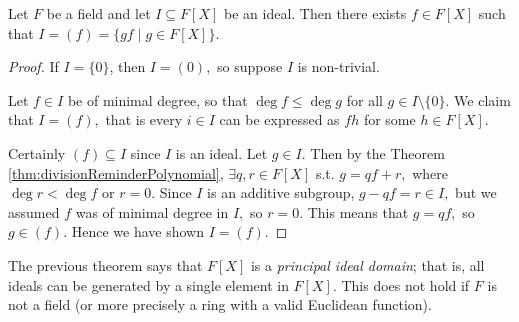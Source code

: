 \begin{theorem}
  Let $F$ be a field and let $I\subseteq F[X]$ be an ideal. Then there exists $f\in
  F[X]$ such that $I=(f)=\{gf \mid g\in F[X]\}$.
  \label{thm:idealPrinciplas}
\end{theorem}
\begin{proof}
  
  If $I=\{0\}$, then $I=(0),$ so suppose $I$ is non-trivial. 
  
  Let $f \in I$ be of minimal degree, so that $\deg f \leq \deg g$ for all $g \in I\setminus\{0\}.$ We claim that $I = (f),$ that is every $i \in I$ can be expressed as $fh$ for some $h \in F[X].$

  Certainly $(f) \subseteq I$ since $I$ is an ideal. Let $g \in I.$ Then by the Theorem \ref{thm:divisionReminderPolynomial}, $\exists q,r \in F[X]$ s.t. $g = qf + r,$ where $\deg r < \deg f$ or $r = 0.$ Since $I$ is an additive subgroup, $g - qf = r \in I,$ but we assumed $f$ was of minimal degree in $I,$ so $r = 0$. This means that $g = qf,$ so $g\in (f).$ Hence we have shown $I = (f).$
\end{proof}
\begin{remark}
  The previous theorem says that $F[X]$ is a \emph{principal ideal domain}; that is, all ideals can be generated by a single element in $F[X]$.
  This does not hold if $F$ is not a field (or more precisely a ring with a valid Euclidean function). 
\end{remark}

